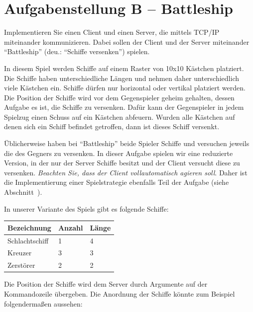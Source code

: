 

\usepackage{graphicx}
\usepackage{bytefield}

\newcommand{\baselinecenterit}[1]{%
  \centering
  \raisebox{0pt}[\heightof{W}][0pt]{\itshape #1}%
}


\sloppy
{}

\section*{Aufgabenstellung B -- Battleship}\label{sec:aufgabenstellung}
Implementieren Sie einen Client und einen Server, die mittels TCP/IP
miteinander kommunizieren. Dabei sollen der Client und der Server miteinander
``Battleship'' (deu.: ``Schiffe versenken'') spielen.

In diesem Spiel werden Schiffe auf einem Raster von 10x10 Kästchen platziert.
Die Schiffe haben unterschiedliche Längen und nehmen daher unterschiedlich viele Kästchen ein.
Schiffe dürfen nur horizontal oder vertikal platziert werden.
Die Position der Schiffe wird vor dem Gegenspieler geheim gehalten,
dessen Aufgabe es ist, die Schiffe zu versenken.
Dafür kann der Gegenspieler in jedem Spielzug einen Schuss auf ein Kästchen abfeuern.
Wurden alle Kästchen auf denen sich ein Schiff befindet getroffen, dann ist dieses Schiff versenkt.

Üblicherweise haben bei ``Battleship'' beide Spieler Schiffe und versuchen jeweils die des Gegners
zu versenken. In dieser Aufgabe spielen wir eine reduzierte Version,
in der nur der Server Schiffe besitzt und der Client versucht diese zu versenken.
\emph{Beachten Sie, dass der Client vollautomatisch agieren soll}. Daher
ist die Implementierung einer Spielstrategie ebenfalls Teil der Aufgabe
(siehe Abschnitt~).

In unserer Variante des Spiels gibt es folgende Schiffe:

{\centering
\begin{tabular}{ | l | l | l | }
\hline
Bezeichnung    & Anzahl & Länge \\
\hline
Schlachtschiff & 1 & 4 \\
Kreuzer        & 3 & 3 \\
Zerstörer      & 2 & 2 \\
\hline
\end{tabular}\par
}

Die Position der Schiffe wird dem Server durch Argumente auf der Kommandozeile
übergeben. Die Anordnung der Schiffe könnte zum Beispiel folgendermaßen aussehen:

